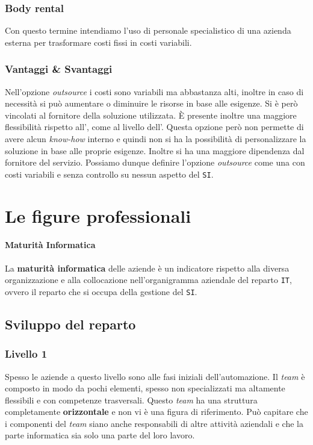         \subsubsection{Body rental}
            Con questo termine intendiamo l'uso di personale specialistico di una azienda esterna per trasformare costi fissi in costi variabili.
        \subsubsection{Vantaggi \& Svantaggi}
            Nell'opzione \textit{outsource} i costi sono variabili ma abbastanza alti, inoltre in caso di necessità si può aumentare o diminuire le risorse in base alle esigenze. Si è però vincolati al fornitore della soluzione utilizzata. È presente inoltre una maggiore flessibilità rispetto all', come al livello dell'. Questa opzione però non permette di avere alcun \textit{know-how} interno e quindi non si ha la possibilità di personalizzare la soluzione in base alle proprie esigenze. Inoltre si ha una maggiore dipendenza dal fornitore del servizio. Possiamo dunque definire l'opzione \textit{outsource} come una  con costi variabili e senza controllo su nessun aspetto del \texttt{SI}.

\section{Le figure professionali}
    \paragraph{Maturità Informatica} 
        La \textbf{maturità informatica} delle aziende è un indicatore rispetto alla diversa organizzazione e alla collocazione nell'organigramma aziendale del reparto \texttt{IT}, ovvero il reparto che si occupa della gestione del \texttt{SI}. 
    \subsection{Sviluppo del reparto}
        \subsubsection{Livello 1}
            Spesso le aziende a questo livello sono alle fasi iniziali dell'automazione.
            Il \textit{team} è composto in modo da pochi elementi, spesso non specializzati ma altamente flessibili e con competenze trasversali. Questo \textit{team} ha una struttura completamente \textbf{orizzontale} e non vi è una figura di riferimento. Può capitare che i componenti del \textit{team} siano anche responsabili di altre attività aziendali e che la parte informatica sia solo una parte del loro lavoro.
